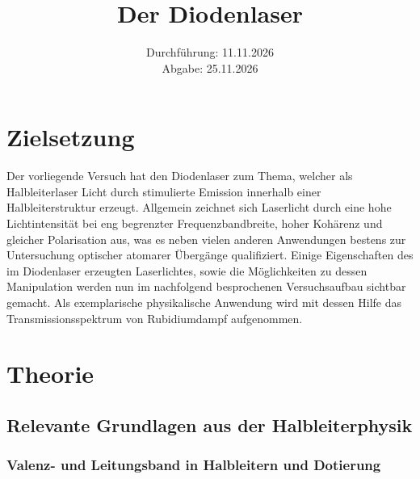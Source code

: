  



\subject{V60}
\title{Der Diodenlaser} \date{Durchführung: 11.11.2026 \\ Abgabe: 25.11.2026 }

\maketitle
\thispagestyle{empty}

\clearpage

\tableofcontents
\clearpage


\section{Zielsetzung}

Der vorliegende Versuch hat den Diodenlaser zum Thema, welcher als Halbleiterlaser Licht durch stimulierte Emission innerhalb einer Halbleiterstruktur erzeugt.
Allgemein zeichnet sich Laserlicht durch eine hohe Lichtintensität bei eng begrenzter Frequenzbandbreite, hoher Kohärenz und gleicher Polarisation aus, was 
es neben vielen anderen Anwendungen bestens zur Untersuchung optischer atomarer Übergänge qualifiziert.
Einige Eigenschaften des im Diodenlaser erzeugten Laserlichtes, sowie die Möglichkeiten zu dessen Manipulation werden nun im nachfolgend besprochenen Versuchsaufbau 
sichtbar gemacht. Als exemplarische physikalische Anwendung wird mit dessen Hilfe das Transmissionsspektrum von Rubidiumdampf aufgenommen.






\section{Theorie}

\subsection{Relevante Grundlagen aus der Halbleiterphysik}

\subsubsection{Valenz- und Leitungsband in Halbleitern und Dotierung}

